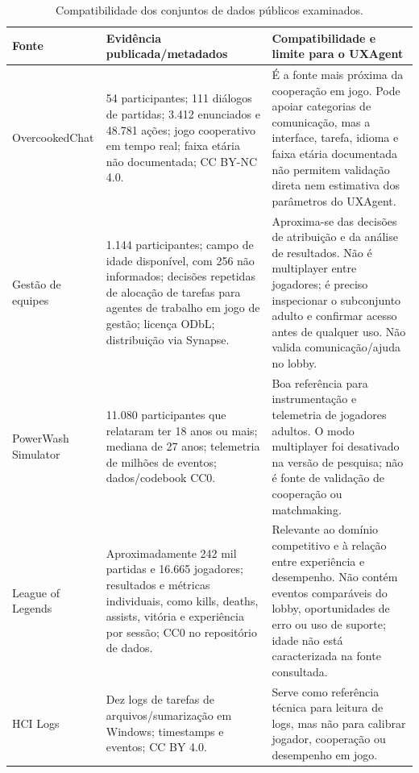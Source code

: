 \documentclass[conference]{IEEEtran}
\begin{document}
\begin{table}[!t]
\centering
\caption{Compatibilidade dos conjuntos de dados públicos examinados.}
\label{tab:compatibilidade}
\scriptsize
\renewcommand{\arraystretch}{1.08}
\begin{tabularx}{\textwidth}{@{}p{2.45cm}Y Y@{}}
\toprule
\textbf{Fonte} & \textbf{Evidência publicada/metadados} & \textbf{Compatibilidade e limite para o UXAgent} \\
\midrule
OvercookedChat \cite{nakae2025,overcooked_repo} & 54 participantes; 111 diálogos de partidas; 3.412 enunciados e 48.781 ações; jogo cooperativo em tempo real; faixa etária não documentada; CC BY-NC 4.0. & É a fonte mais próxima da cooperação em jogo. Pode apoiar categorias de comunicação, mas a interface, tarefa, idioma e faixa etária documentada não permitem validação direta nem estimativa dos parâmetros do UXAgent. \\
Gestão de equipes \cite{teamwork_dataset} & 1.144 participantes; campo de idade disponível, com 256 não informados; decisões repetidas de alocação de tarefas para agentes de trabalho em jogo de gestão; licença ODbL; distribuição via Synapse. & Aproxima-se das decisões de atribuição e da análise de resultados. Não é multiplayer entre jogadores; é preciso inspecionar o subconjunto adulto e confirmar acesso antes de qualquer uso. Não valida comunicação/ajuda no lobby. \\
PowerWash Simulator \cite{powerwash_dataset} & 11.080 participantes que relataram ter 18 anos ou mais; mediana de 27 anos; telemetria de milhões de eventos; dados/codebook CC0. & Boa referência para instrumentação e telemetria de jogadores adultos. O modo multiplayer foi desativado na versão de pesquisa; não é fonte de validação de cooperação ou matchmaking. \\
League of Legends \cite{lol_dataset} & Aproximadamente 242 mil partidas e 16.665 jogadores; resultados e métricas individuais, como kills, deaths, assists, vitória e experiência por sessão; CC0 no repositório de dados. & Relevante ao domínio competitivo e à relação entre experiência e desempenho. Não contém eventos comparáveis do lobby, oportunidades de erro ou uso de suporte; idade não está caracterizada na fonte consultada. \\
HCI Logs \cite{uiclogs} & Dez logs de tarefas de arquivos/sumarização em Windows; timestamps e eventos; CC BY 4.0. & Serve como referência técnica para leitura de logs, mas não para calibrar jogador, cooperação ou desempenho em jogo. \\
\bottomrule
\end{tabularx}
\end{table}
\end{document}
